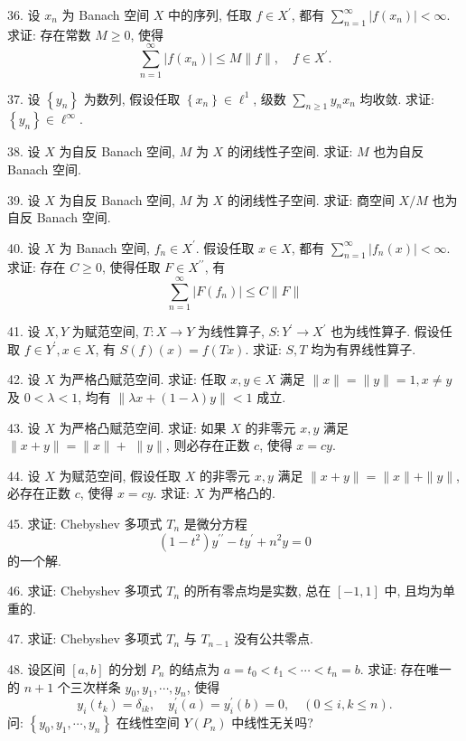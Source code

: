 \documentclass[openany]{ctexbook}
\theoremstyle{kaiti}
\theoremstyle{normal}
\begin{document}
36. 设 $x_n$ 为 Banach 空间 $X$ 中的序列, 任取 $f \in X^{\prime}$, 都有 $\sum_{n=1}^{\infty}\left|f\left(x_n\right)\right|<\infty$. 求证: 存在常数 $M \geqslant 0$, 使得
$$
\sum_{n=1}^{\infty}\left|f\left(x_n\right)\right| \leqslant M\|f\|, \quad f \in X^{\prime}.
$$

37. 设 $\left\{y_n\right\}$ 为数列, 假设任取 $\left\{x_n\right\} \in \ell^1$, 级数 $\sum_{n \geqslant 1} y_n x_n$ 均收敛. 求证: $\left\{y_n\right\} \in \ell^{\infty}$.

38. 设 $X$ 为自反 Banach 空间, $M$ 为 $X$ 的闭线性子空间. 求证: $M$ 也为自反 Banach 空间.

39. 设 $X$ 为自反 Banach 空间, $M$ 为 $X$ 的闭线性子空间. 求证: 商空间 $X / M$ 也为自反 Banach 空间.

40. 设 $X$ 为 Banach 空间, $f_n \in X^{\prime}$. 假设任取 $x \in X$, 都有 $\sum_{n=1}^{\infty}\left|f_n(x)\right|<\infty$. 求证: 存在 $C \geqslant 0$, 使得任取 $F \in X^{\prime \prime}$, 有
$$
\sum_{n=1}^{\infty}\left|F\left(f_n\right)\right| \leqslant C\|F\|
$$

41. 设 $X, Y$ 为赋范空间, $T: X \rightarrow Y$ 为线性算子, $S: Y^{\prime} \rightarrow X^{\prime}$ 也为线性算子. 假设任取 $f \in Y^{\prime}, x \in X$, 有 $S(f)(x)=f(T x)$. 求证: $S, T$ 均为有界线性算子.

42. 设 $X$ 为严格凸赋范空间. 求证: 任取 $x, y \in X$ 满足 $\|x\|=\|y\|=1, x \neq y$ 及 $0<\lambda<1$, 均有 $\|\lambda x+(1-\lambda) y\|<1$ 成立.

43. 设 $X$ 为严格凸赋范空间. 求证: 如果 $X$ 的非零元 $x, y$ 满足 $\|x+y\|=\|x\|+$ $\|y\|$, 则必存在正数 $c$, 使得 $x=c y$.

44. 设 $X$ 为赋范空间, 假设任取 $X$ 的非零元 $x, y$ 满足 $\|x+y\|=\|x\|+\|y\|$, 必存在正数 $c$, 使得 $x=c y$. 求证: $X$ 为严格凸的.

45. 求证: Chebyshev 多项式 $T_n$ 是微分方程
$$
\left(1-t^2\right) y^{\prime \prime}-t y^{\prime}+n^2 y=0
$$
的一个解.

46. 求证: Chebyshev 多项式 $T_n$ 的所有零点均是实数, 总在 $[-1,1]$ 中, 且均为单重的.

47. 求证: Chebyshev 多项式 $T_n$ 与 $T_{n-1}$ 没有公共零点.

48. 设区间 $[a, b]$ 的分划 $P_n$ 的结点为 $a=t_0<t_1<\cdots<t_n=b$. 求证: 存在唯一的 $n+1$ 个三次样条 $y_0, y_1, \cdots, y_n$, 使得
$$
y_{i}\left(t_{k}\right)=\delta_{i k}, \quad y_{i}^{\prime}(a)=y_{i}^{\prime}(b)=0, \quad(0 \leqslant i, k \leqslant n).
$$
问: $\left\{y_0, y_1, \cdots, y_n\right\}$ 在线性空间 $Y\left(P_n\right)$ 中线性无关吗?
\end{document}
